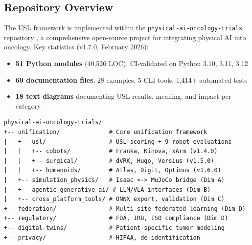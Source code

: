 \documentclass[11pt,a4paper]{article}
\begin{document}
\subsection{Repository Overview}
The USL framework is implemented within the \texttt{physical-ai-oncology-trials} repository \cite{kawchak2026repo}, a comprehensive open-source project for integrating physical AI into oncology. Key statistics (v1.7.0, February 2026):
\begin{itemize}
  \item \textbf{51 Python modules} (40,526 LOC), CI-validated on Python 3.10, 3.11, 3.12
  \item \textbf{69 documentation files}, 28 examples, 5 CLI tools, 1,414+ automated tests
  \item \textbf{18 text diagrams} documenting USL results, meaning, and impact per category
\end{itemize}

\begin{lstlisting}[language={},basicstyle=\ttfamily\scriptsize,numbers=none]
physical-ai-oncology-trials/
+-- unification/              # Core unification framework
|   +-- usl/                  # USL scoring + 9 robot evaluations
|   |   +-- cobots/           # Franka, Kinova, xArm (v1.4.0)
|   |   +-- surgical/         # dVRK, Hugo, Versius (v1.5.0)
|   |   +-- humanoids/        # Atlas, Digit, Optimus (v1.6.0)
|   +-- simulation_physics/   # Isaac <-> MuJoCo bridge (Dim A)
|   +-- agentic_generative_ai/ # LLM/VLA interfaces (Dim B)
|   +-- cross_platform_tools/ # ONNX export, validation (Dim C)
+-- federation/               # Multi-site federated learning (Dim D)
+-- regulatory/               # FDA, IRB, ISO compliance (Dim D)
+-- digital-twins/            # Patient-specific tumor modeling
+-- privacy/                  # HIPAA, de-identification
\end{lstlisting}
\end{document}
